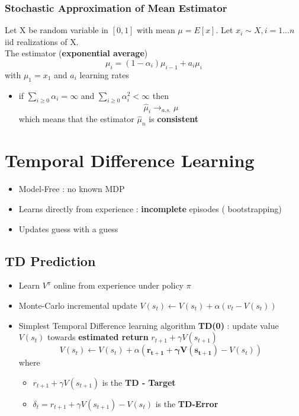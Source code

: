 \documentclass[12pt]{article} %
\begin{document}
\subsubsection{Stochastic Approximation of Mean Estimator}
Let X be random variable in $[0,1]$ with mean $\mu=E[x]$. Let $x_i \sim X,i=1...n$ iid realizations of X.\\
The estimator (\textbf{exponential average}) 
$$ \mu_i=(1-\alpha_i)\mu_{i-1}+a_i\mu_i$$
with $\mu_1 = x_1$ and $a_i$ learning rates

\begin{itemize}
\item if $\sum_{i \geq 0 }\alpha_i= \infty$ and $\sum_{i \geq 0 }\alpha^2_i < \infty$ then $$ \hat{\mu}_i \rightarrow_{a.s.} \mu$$ which means that the estimator $\hat{\mu}_n$ is \textbf{consistent}
\end{itemize}

\section{Temporal Difference Learning}
\begin{itemize}
\item  Model-Free : no known MDP
\item  Learns directly from experience : \textbf{incomplete} episodes ( bootstrapping)
\item Updates guess with a guess
\end{itemize}

\subsection{TD Prediction}
\begin{itemize}
\item Learn $V^{\pi}$ online from experience under policy $\pi$
\item Monte-Carlo incremental update $ V(s_t) \leftarrow V(s_t) + \alpha(v_t - V(s_t))$
\item Simplest Temporal Difference learning algorithm \textbf{TD(0)} : update value $V(s_t)$ towards \textbf{estimated return} $r_{t+1} + \gamma V(s_{t+1})$
$$ V(s_t) \leftarrow V(s_t) + \alpha(\bm{r_{t+1}+\gamma V(s_{t+1})} - V(s_t))$$
where 
\begin{itemize}
\item $r_{t+1}+ \gamma V(s_{t+1})$ is the \textbf{TD - Target}
\item $\delta_t = r_{t+1}+ \gamma V(s_{t+1}) - V(s_t)$ is the \textbf{TD-Error}
\end{itemize}
\end{itemize}
\end{document}
